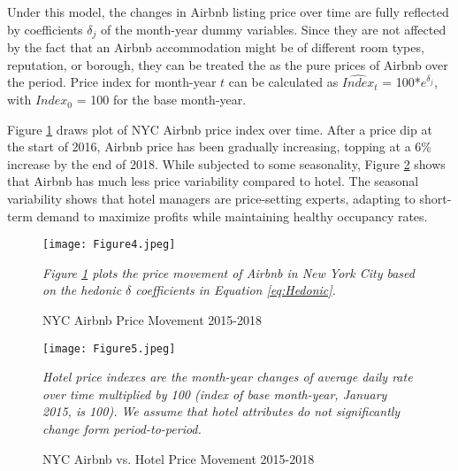 \documentclass[12pt]{article}
\begin{document}
			\par
			Under this model, the changes in Airbnb listing price over time are fully reflected by coefficients $\delta_j$ of the month-year dummy variables. Since they are not affected by the fact that an Airbnb accommodation might be of different room types, reputation, or borough, they can be treated the as the pure prices of Airbnb over the period. Price index for month-year $t$ can be calculated as $\hat{Index}_t$ = 100*$e^{\delta_j}$, with $Index_0$ = 100 for the base month-year. 
			
			\par
			Figure \ref{fig:AirbnbPrice} draws plot of NYC Airbnb price index over time. After a price dip at the start of 2016, Airbnb price has been gradually increasing, topping at a 6\% increase by the end of 2018. While subjected to some seasonality, Figure \ref{fig:AirbnbvsHotelPrice} shows that Airbnb has much less price variability compared to hotel. The seasonal variability shows that hotel managers are price-setting experts, adapting to short-term demand to maximize profits while maintaining healthy occupancy rates.
			
		\begin{figure}[!htbp] %
			\begin{center}
				\caption{NYC Airbnb Price Movement 2015-2018}
				\label{fig:AirbnbPrice}
				\texttt{[image: Figure4.jpeg]}
			\end{center}
			\vspace{-.2in}
			\emph{Figure \ref{fig:AirbnbPrice} plots the price movement of Airbnb in New York City based on the hedonic $\delta$ coefficients in Equation \ref{eq:Hedonic}.}
		\end{figure}
			
			\begin{figure}[!htbp] %
			\begin{center}
				\caption{NYC Airbnb vs. Hotel Price Movement 2015-2018}
				\label{fig:AirbnbvsHotelPrice}
				\texttt{[image: Figure5.jpeg]}
			\end{center}
			\vspace{-.2in}
			\emph{Hotel price indexes are the month-year changes of average daily rate over time multiplied by 100 (index of base month-year, January 2015, is 100). We assume that hotel attributes do not significantly change form period-to-period.}
		\end{figure}
\end{document}
